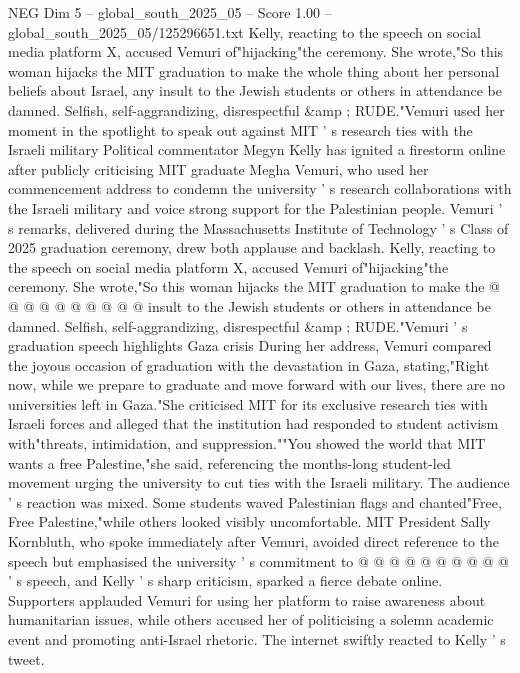 \begin{textsample}{NEG Dim 5 – global\_south\_2025\_05 – Score 1.00 – global\_south\_2025\_05/125296651.txt}  \label{ex:f5_neg_339}
Kelly, reacting to the speech on social media platform X, accused Vemuri of"hijacking"the ceremony.
She wrote,"So this woman hijacks the MIT graduation to make the whole thing about her personal beliefs about Israel, any insult to the Jewish students or others in attendance be damned.
Selfish, self-aggrandizing, disrespectful \&amp ; RUDE."Vemuri used her moment in the spotlight to speak out against MIT ' s research ties with the Israeli military Political commentator Megyn Kelly has ignited a firestorm online after publicly criticising MIT graduate Megha Vemuri, who used her commencement address to condemn the university ' s research collaborations with the Israeli military and voice strong support for the Palestinian people.
Vemuri ' s remarks, delivered during the Massachusetts Institute of Technology ' s Class of 2025 graduation ceremony, drew both applause and backlash.
Kelly, reacting to the speech on social media platform X, accused Vemuri of"hijacking"the ceremony.
She wrote,"So this woman hijacks the MIT graduation to make the @ @ @ @ @ @ @ @ @ @ insult to the Jewish students or others in attendance be damned.
Selfish, self-aggrandizing, disrespectful \&amp ; RUDE."Vemuri ' s graduation speech highlights Gaza crisis During her address, Vemuri compared the joyous occasion of graduation with the devastation in Gaza, stating,"Right now, while we prepare to graduate and move forward with our lives, there are no universities left in Gaza."She criticised MIT for its exclusive research ties with Israeli forces and alleged that the institution had responded to student activism with"threats, intimidation, and suppression.""You showed the world that MIT wants a free Palestine,"she said, referencing the months-long student-led movement urging the university to cut ties with the Israeli military.
The audience ' s reaction was mixed.
Some students waved Palestinian flags and chanted"Free, Free Palestine,"while others looked visibly uncomfortable.
MIT President Sally Kornbluth, who spoke immediately after Vemuri, avoided direct reference to the speech but emphasised the university ' s commitment to @ @ @ @ @ @ @ @ @ @ ' s speech, and Kelly ' s sharp criticism, sparked a fierce debate online.
Supporters applauded Vemuri for using her platform to raise awareness about humanitarian issues, while others accused her of politicising a solemn academic event and promoting anti-Israel rhetoric.
The internet swiftly reacted to Kelly ' s tweet.

\end{textsample}
